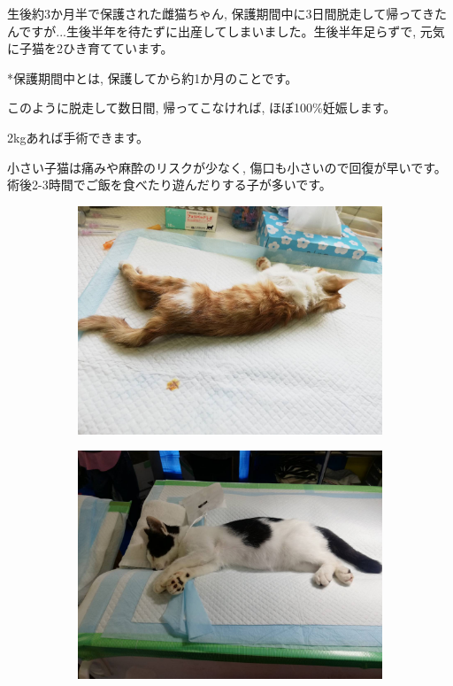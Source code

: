 \documentclass{jsarticle}
\begin{document}
\Large
  生後約3か月半で保護された雌猫ちゃん, 保護期間中に3日間脱走して帰ってきたんですが...生後半年を待たずに出産してしまいました。生後半年足らずで, 元気に子猫を2ひき育てています。

  *保護期間中とは, 保護してから約1か月のことです。

このように脱走して数日間, 帰ってこなければ, ほぼ100\%妊娠します。

	\huge
	  2\si{\kilogram}あれば手術できます。

	\Large
	  小さい子猫は痛みや麻酔のリスクが少なく, 傷口も小さいので回復が早いです。術後2-3時間でご飯を食べたり遊んだりする子が多いです。

		\begin{figure}[htbp]
			\centering
			\begin{subfigure}{0.4\columnwidth}
				\centering
				\includegraphics[width=\columnwidth]{3.jpg}
			\end{subfigure}
			\begin{subfigure}{0.4\columnwidth}
				\centering
				\includegraphics[width=\columnwidth]{4.jpg}
			\end{subfigure}
		\end{figure}
\end{document}
